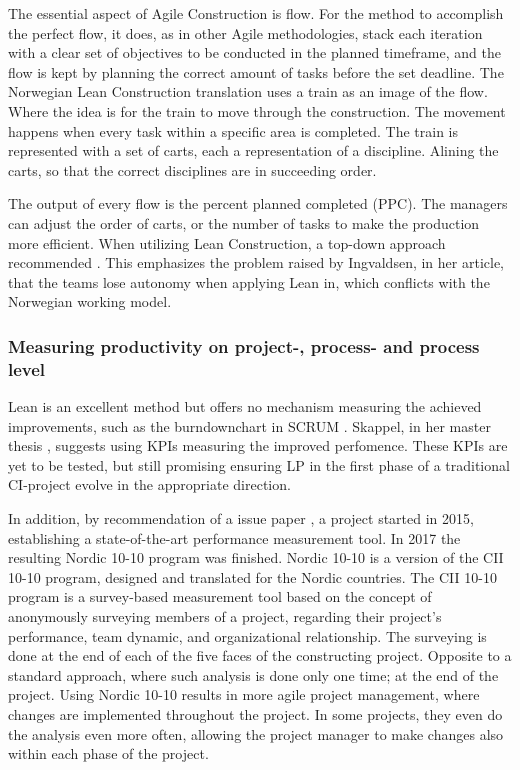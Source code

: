 The essential aspect of Agile Construction is flow. For the method to accomplish the perfect flow, it does, as in other Agile methodologies, stack each iteration with a clear set of objectives to be conducted in the planned timeframe, and the flow is kept by planning the correct amount of tasks before the set deadline. The Norwegian Lean Construction translation uses a train as an image of the flow. Where the idea is for the train to move through the construction. The movement happens when every task within a specific area is completed. The train is represented with a set of carts, each a representation of a discipline. Alining the carts, so that the correct disciplines are in succeeding order.

The output of every flow is the percent planned completed (PPC). The managers can adjust the order of carts, or the number of tasks to make the production more efficient. When utilizing Lean Construction, a top-down approach recommended \cite{lean_i_praksis}. This emphasizes the problem raised by Ingvaldsen, in her article, that the teams lose autonomy when applying Lean in, which conflicts with the Norwegian working model.

\subsubsection{Measuring productivity on project-, process- and process level}
Lean is an excellent method but offers no mechanism measuring the achieved improvements, such as the burndownchart in SCRUM \cite{sutherland}. Skappel, in her master thesis \cite{KPIs_in_lean}, suggests using KPIs measuring the improved perfomence. 
These KPIs are yet to be tested, but still promising ensuring LP in the first phase of a traditional CI-project evolve in the appropriate direction. 

In addition, by recommendation of a issue paper \cite{langlo2013maaling}, a project started in 2015, establishing a state-of-the-art performance measurement tool. In 2017 the resulting Nordic 10-10 \cite{nordic-10-10} program was finished. Nordic 10-10 is a version of the CII 10-10 program\cite{CII-10-10}, designed and translated for the Nordic countries. The CII 10-10 program is a survey-based measurement tool based on the concept of anonymously surveying members of a project, regarding their project's performance, team dynamic, and organizational relationship. The surveying is done at the end of each of the five faces of the constructing project. Opposite to a standard approach, where such analysis is done only one time; at the end of the project. Using Nordic 10-10 results in more agile project management, where changes are implemented throughout the project. In some projects, they even do the analysis even more often, allowing the project manager to make changes also within each phase of the project. 

